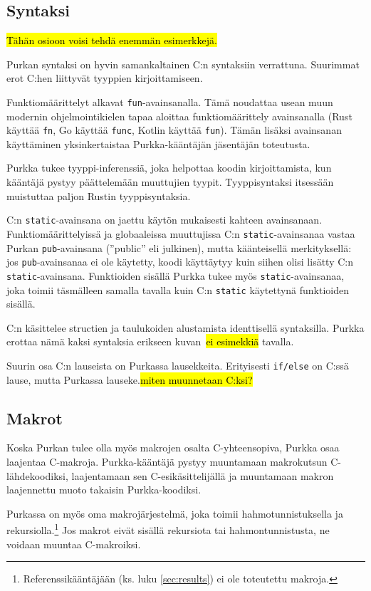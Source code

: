 \subsection{Syntaksi}

\hl{Tähän osioon voisi tehdä enemmän esimerkkejä.}

Purkan syntaksi on hyvin samankaltainen C:n syntaksiin verrattuna. Suurimmat
erot C:hen liittyvät tyyppien kirjoittamiseen.

Funktiomäärittelyt alkavat \texttt{fun}-avainsanalla. Tämä noudattaa
usean muun modernin ohjelmointikielen tapaa aloittaa funktiomäärittely
avainsanalla (Rust käyttää \texttt{fn}, Go käyttää \texttt{func}, Kotlin
käyttää \texttt{fun}). Tämän lisäksi avainsanan käyttäminen yksinkertaistaa
Purkka-kääntäjän jäsentäjän toteutusta.

Purkka tukee tyyppi-inferenssiä, joka helpottaa koodin kirjoittamista, kun
kääntäjä pystyy päättelemään muuttujien tyypit. Tyyppisyntaksi itsessään
muistuttaa paljon Rustin tyyppisyntaksia.

C:n \texttt{static}-avainsana on jaettu käytön mukaisesti kahteen avainsanaan.
Funktiomäärittelyissä ja globaaleissa muuttujissa C:n
\texttt{static}-avainsanaa vastaa Purkan \texttt{pub}-avainsana (''public'' eli
julkinen), mutta käänteisellä merkityksellä: jos \texttt{pub}-avainsanaa ei ole
käytetty, koodi käyttäytyy kuin siihen olisi lisätty C:n
\texttt{static}-avainsana. Funktioiden sisällä Purkka tukee myös
\texttt{static}-avainsanaa, joka toimii täsmälleen samalla tavalla kuin C:n
\texttt{static} käytettynä funktioiden sisällä.

C:n käsittelee structien ja taulukoiden alustamista identtisellä syntaksilla.
Purkka erottaa nämä kaksi syntaksia erikseen kuvan~\hl{ei esimekkiä} tavalla.

Suurin osa C:n lauseista on Purkassa lausekkeita. Erityisesti \texttt{if/else}
on C:ssä lause, mutta Purkassa lauseke.\hl{miten muunnetaan C:ksi?}

\subsection{Makrot}

Koska Purkan tulee olla myös makrojen osalta C-yhteensopiva, Purkka osaa
laajentaa C-makroja. Purkka-kääntäjä pystyy muuntamaan makrokutsun
C-lähdekoodiksi, laajentamaan sen C-esikäsittelijällä ja muuntamaan makron
laajennettu muoto takaisin Purkka-koodiksi.

Purkassa on myös oma makrojärjestelmä, joka toimii hahmotunnistuksella ja
rekursiolla.\footnote{Referenssikääntäjään (ks. luku \ref{sec:results}) ei ole
toteutettu makroja.} Jos makrot eivät sisällä rekursiota tai hahmontunnistusta,
ne voidaan muuntaa C-makroiksi.

